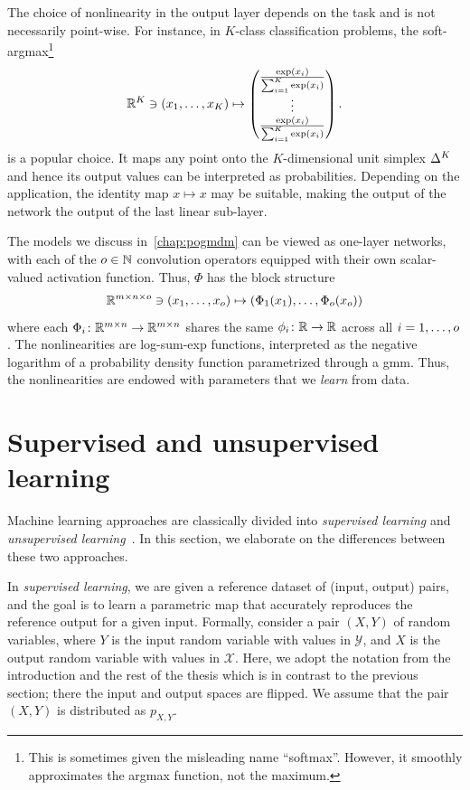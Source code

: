 The choice of nonlinearity in the output layer depends on the task and is not necessarily point-wise.
For instance, in \( K \)-class classification problems, the soft-argmax\footnote{%
	This is sometimes given the misleading name \enquote{softmax}.
	However, it smoothly approximates the argmax function, not the maximum.
}
\begin{equation}
	\mathbb{R}^K \ni (x_{\num{1}}, \dotsc, x_K) \mapsto \begin{pmatrix}
		\frac{\exp(x_i)}{\sum_{i=\num{1}}^K\exp(x_i)}\\
		\vdots\\
		\frac{\exp(x_i)}{\sum_{i=\num{1}}^K\exp(x_i)}
	\end{pmatrix}.
\end{equation}
is a popular choice.
It maps any point onto the \( K \)-dimensional unit simplex \( \Delta^K \) and hence its output values can be interpreted as probabilities.
Depending on the application, the identity map \( x \mapsto x \) may be suitable, making the output of the network the output of the last linear sub-layer.

The models we discuss in~\cref{chap:pogmdm} can be viewed as one-layer networks, with each of the \( o \in \mathbb{N} \) convolution operators equipped with their own scalar-valued activation function.
Thus, \( \Phi \) has the block structure
\begin{equation}
	\mathbb{R}^{m \times n \times o} \ni (x_{\num{1}}, \dotsc, x_{o}) \mapsto (\Phi_{\num{1}}(x_{\num{1}}), \dotsc, \Phi_o(x_o))
\end{equation}
where each \( \Phi_i \colon \mathbb{R}^{m \times n} \to {\mathbb{R}^{m\times n}} \) shares the same \( \phi_i \colon \mathbb{R} \to \mathbb{R} \) across all \( i = \num{1}, \dotsc, o \).
The nonlinearities are log-sum-exp functions, interpreted as the negative logarithm of a probability density function parametrized through a \gls{gmm}.
Thus, the nonlinearities are endowed with parameters that we \emph{learn} from data.
\section{Supervised and unsupervised learning}
Machine learning approaches are classically divided into \emph{supervised learning} and \emph{unsupervised learning}~\cite{bishop_pattern_2006}.
In this section, we elaborate on the differences between these two approaches.

In \emph{supervised learning}, we are given a reference dataset of (input, output) pairs, and the goal is to learn a parametric map that accurately reproduces the reference output for a given input.
Formally, consider a pair \( (X, Y) \) of random variables, where \( Y \) is the input random variable with values in \( \mathcal{Y} \), and \( X \) is the output random variable with values in \( \mathcal{X} \).
Here, we adopt the notation from the introduction and the rest of the thesis which is in contrast to the previous section; there the input and output spaces are flipped.
We assume that the pair \( (X, Y) \) is distributed as \( p_{X, Y} \).

